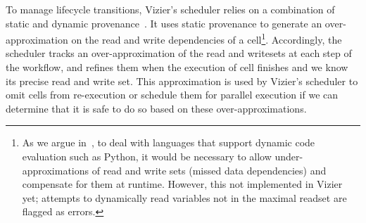 To manage lifecycle transitions, Vizier's scheduler relies on a combination of static and dynamic provenance~\cite{DG22}.
It uses static provenance to generate an over-approximation on the read and write dependencies of a cell\footnote{As we argue in~\cite{DG22}, to deal with languages that support dynamic code evaluation such as Python, it would be necessary to allow under-approximations of read and write sets (missed data dependencies) and compensate for them at runtime. However, this not implemented in Vizier yet; attempts to dynamically read variables not in the maximal readset are flagged as errors.}.
Accordingly, the scheduler tracks an over-approximation of the read and writesets at each step of the workflow, and refines them when the execution of cell finishes and we know its precise read and write set. 
This approximation is used by Vizier's scheduler to omit cells from re-execution or schedule them for parallel execution if we can determine that it is safe to do so based on these over-approximations.



